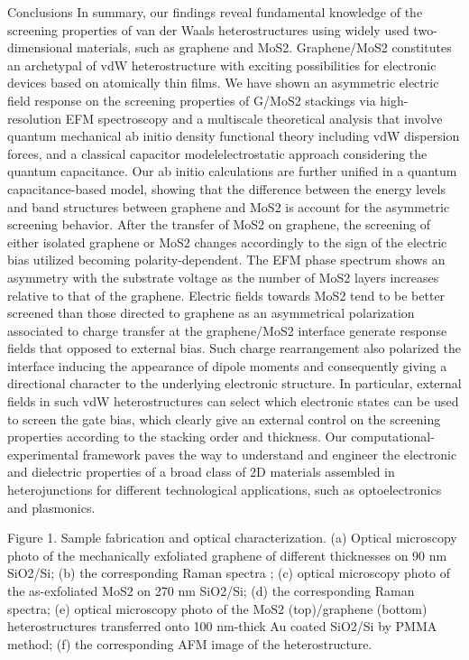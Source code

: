 Conclusions 
In summary, our findings reveal fundamental knowledge of the screening properties of van der Waals heterostructures using widely used two-dimensional materials, such as graphene and MoS2. Graphene/MoS2 constitutes an archetypal of vdW heterostructure with exciting possibilities for electronic devices based on atomically thin films.  We have shown an asymmetric electric field response on the screening properties of G/MoS2 stackings via high-resolution EFM spectroscopy and a multiscale theoretical analysis that involve quantum mechanical ab initio density functional theory including vdW dispersion forces, and a classical capacitor modelelectrostatic approach considering the quantum capacitance.  Our ab initio calculations are further unified in a quantum capacitance-based model, showing that the difference between the energy levels and band structures between graphene and MoS2 is account for the asymmetric screening behavior. After the transfer of MoS2 on graphene, the screening of either isolated graphene or MoS2 changes accordingly to the sign of the electric bias utilized becoming polarity-dependent. The EFM phase spectrum shows an asymmetry with the substrate voltage as the number of MoS2 layers increases relative to that of the graphene. Electric fields towards MoS2 tend to be better screened than those directed to graphene as an asymmetrical polarization associated to charge transfer at the graphene/MoS2 interface generate response fields that opposed to external bias. Such charge rearrangement also polarized the interface inducing the appearance of dipole moments and consequently giving a directional character to the underlying electronic structure. In particular, external fields in such vdW heterostructures can select which electronic states can be used to screen the gate bias, which clearly give an external control on the screening properties according to the stacking order and thickness. Our computational-experimental framework paves the way to understand and engineer the electronic and dielectric properties of a broad class of 2D materials assembled in heterojunctions for different technological applications, such as optoelectronics and plasmonics. 


 
Figure 1. Sample fabrication and optical characterization. (a) Optical microscopy photo of the mechanically exfoliated graphene of different thicknesses on 90 nm SiO2/Si; (b) the corresponding Raman spectra ; (c) optical microscopy photo of the as-exfoliated MoS2 on 270 nm SiO2/Si; (d) the corresponding Raman spectra; (e) optical microscopy photo of the MoS2 (top)/graphene (bottom) heterostructures transferred onto 100 nm-thick Au coated SiO2/Si by PMMA method; (f) the corresponding AFM image of the heterostructure.
 

